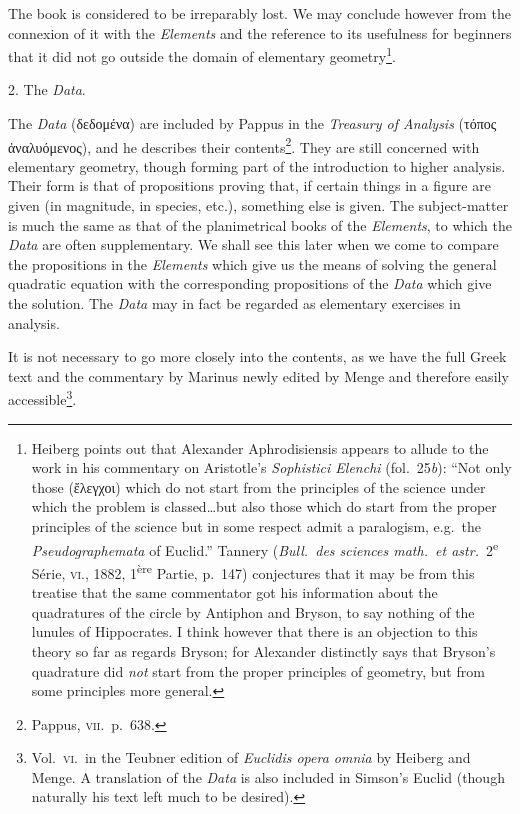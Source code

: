 The book is considered to be irreparably lost. We may conclude however from the connexion of it with the \emph{Elements} and the reference to its usefulness for beginners that it did not go outside the domain of elementary geometry\footnote{Heiberg points out that Alexander Aphrodisiensis appears to allude to the work in his commentary on Aristotle's \emph{Sophistici Elenchi} (fol.~25\emph{b}): ``Not only those (ἔλεγχοι) which do not start from the principles of the science under which the problem is classed\dots but also those which do start from the proper principles of the science but in some respect admit a paralogism, e.g.\ the \emph{Pseudographemata} of Euclid.'' Tannery (\emph{Bull.\ des sciences math.\ et astr.}\ 2\textsuperscript{e} Série, \textsc{vi.}, 1882, 1\textsuperscript{ère} Partie, p.~147) conjectures that it may be from this treatise that the same commentator got his information about the quadratures of the circle by Antiphon and Bryson, to say nothing of the lunules of Hippocrates. I think however that there is an objection to this theory so far as regards Bryson; for Alexander distinctly says that Bryson's quadrature did \emph{not} start from the proper principles of geometry, but from some principles more general.}.

2. The \emph{Data}.

The \emph{Data} (δεδομένα) are included by Pappus in the \emph{Treasury of Analysis} (τόπος ἀναλυόμενος), and he describes their contents\footnote{Pappus, \textsc{vii.}\ p.~638.}. They are still concerned with elementary geometry, though forming part of the introduction to higher analysis. Their form is that of propositions proving that, if certain things in a figure are given (in magnitude, in species, etc.), something else is given. The subject-matter is much the same as that of the planimetrical books of the \emph{Elements}, to which the \emph{Data} are often supplementary. We shall see this later when we come to compare the propositions in the \emph{Elements} which give us the means of solving the general quadratic equation with the corresponding propositions of the \emph{Data} which give the solution. The \emph{Data} may in fact be regarded as elementary exercises in analysis.

It is not necessary to go more closely into the contents, as we have the full Greek text and the commentary by Marinus newly edited by Menge and therefore easily accessible\footnote{Vol.~\textsc{vi.}\ in the Teubner edition of \emph{Euclidis opera omnia} by Heiberg and Menge. A translation of the \emph{Data} is also included in Simson's Euclid (though naturally his text left much to be desired).}.

